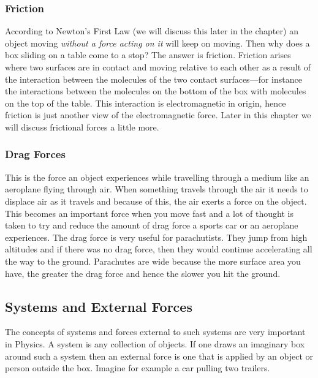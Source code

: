 \subsubsection{Friction}
According to Newton's First Law (we will discuss this later in the chapter) an object moving \emph{without a force acting on it} will keep on moving. Then why does a box sliding on a table come to a stop? The answer is friction. Friction arises where two surfaces are in contact and moving relative to each other as a result of the interaction between the molecules of the two contact surfaces---for instance the interactions between the molecules on the bottom of the box with molecules on the top of the table. This interaction is electromagnetic in origin, hence friction is just another view of the electromagnetic force. Later in this chapter we will discuss frictional forces a little more.

\subsubsection{Drag Forces}
This is the force an object experiences while travelling through a medium like an aeroplane flying through air. When something travels through the air it needs to displace air as it travels and because of this, the air exerts a force on the object. This becomes an important force when you move fast and a lot of thought is taken to try and reduce the amount of drag force a sports car or an aeroplane experiences. The drag force is very useful for parachutists. They jump from high altitudes and if there was no drag force, then they would continue accelerating all the way to the ground. Parachutes are wide because the more surface area you have, the greater the drag force and hence the slower you hit the ground.

\subsection{Systems and External Forces}
The concepts of systems and forces external to such systems are very important in Physics. A system is any collection of objects. If one draws an imaginary box around such a system then an external force is one that
is applied by an object or person outside the box. Imagine for example a car pulling two trailers.

